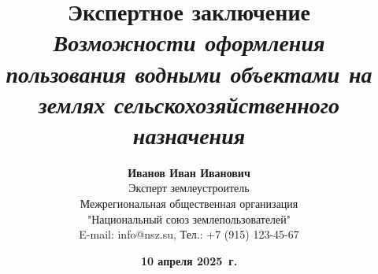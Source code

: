 \newcommand{\OrganizationName}{Межрегиональная общественная организация \\"Национальный союз землепользователей"}
\newcommand{\OrganizationAddress}{125009, г. Москва, пер. Старопименовский, д. 13, стр 4}
\newcommand{\OrganizationPhone}{+7 (915) 123-45-67}
\newcommand{\OrganizationEmail}{info@nsz.su}
\newcommand{\OrganizationWebsite}{https://nsz.su/}
\newcommand{\ReportTitle}{ЭКСПЕРТНЫЙ ОТЧЕТ}
\newcommand{\ReportSubject}{по исследованию землепользования\\[5pt] \textbf{Коломенского рыбхоза "Осенка"}}
\newcommand{\ExpertName}{Иванов Иван Иванович}
\newcommand{\ExpertPosition}{Эксперт землеустроитель}
\newcommand{\ExpertContacts}{\texttt{+7(916)123-45-67}, \texttt{expert@yandex.ru}}
\newcommand{\ReportCity}{Москва}
\newcommand{\ReportYear}{\the\year}

\title{
    \LARGE\textbf{Экспертное заключение} \\
    \large\textit{Возможности оформления пользования водными объектами на землях сельскохозяйственного назначения}
}

\author{
    \small\textbf{\ExpertName} \\[4pt]
    \small \ExpertPosition \\
    \small \OrganizationName \\
    \small {E-mail: \OrganizationEmail}, \small {Тел.: \OrganizationPhone}
}

\date{
    \small\textbf{10 апреля 2025~г.} \\[4pt]
}

\newcommand{\HeaderText}{Экспертное заключение}